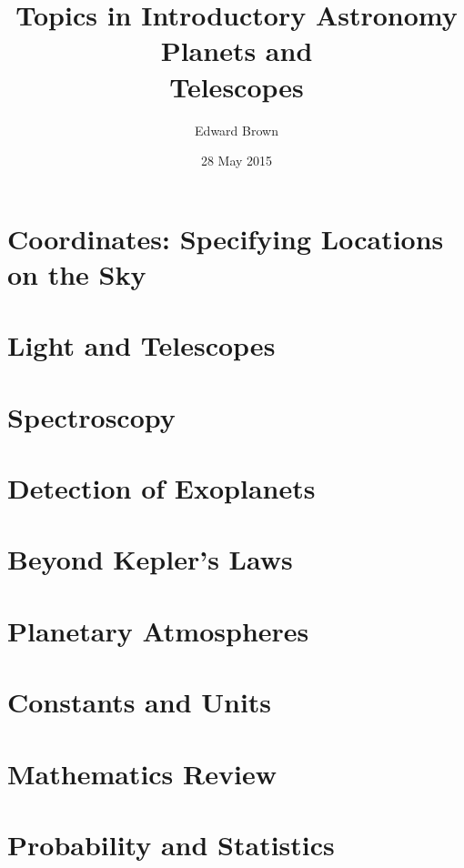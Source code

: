 \documentclass[symmetric]{astro-bookshelf}
\title{{\Large Topics in Introductory Astronomy}\\Planets and\\Telescopes}
\author{Edward Brown}
\date{28 May 2015}
\begin{document}
\frontmatter
{}


\mainmatter
{}
\setcounter{page}{1}

\chapter{Coordinates: Specifying Locations on the Sky}\label{ch.coordinates}


\chapter{Light and Telescopes}\label{ch.light-telescopes}


\chapter{Spectroscopy}\label{ch.spectroscopy}


\chapter{Detection of Exoplanets}\label{ch.detection-exoplanets}


\chapter{Beyond Kepler's Laws}


\chapter{Planetary Atmospheres}


\appendix
\chapter{Constants and Units}


\chapter{Mathematics Review}\label{ch.math-review}


\chapter{Probability and Statistics}\label{ch.probability-statistics}


\backmatter


\end{document}
